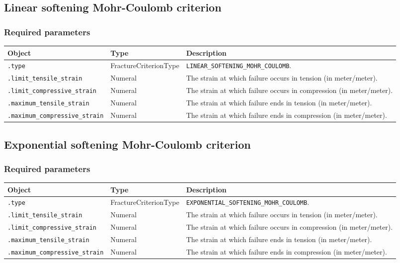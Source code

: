 \documentclass[10pt]{article}
\begin{document}
\subsection{Linear softening Mohr-Coulomb criterion}

\subsubsection*{Required parameters}

\begin{tabularx}{\textwidth}{llX}
\hline 
Object & Type & Description \\ 
\hline 
\verb+.type+ & FractureCriterionType & \verb+LINEAR_SOFTENING_MOHR_COULOMB+. \\ 
\verb+.limit_tensile_strain+ & Numeral & The strain at which failure occurs in tension (in meter/meter).\\
\verb+.limit_compressive_strain+ & Numeral & The strain at which failure occurs in compression (in meter/meter).\\
\verb+.maximum_tensile_strain+ & Numeral & The strain at which failure ends in tension (in meter/meter).\\
\verb+.maximum_compressive_strain+ & Numeral & The strain at which failure ends in compression (in meter/meter).\\
\hline 
\end{tabularx}

\subsection{Exponential softening Mohr-Coulomb criterion}

\subsubsection*{Required parameters}

\begin{tabularx}{\textwidth}{llX}
\hline 
Object & Type & Description \\ 
\hline 
\verb+.type+ & FractureCriterionType & \verb+EXPONENTIAL_SOFTENING_MOHR_COULOMB+. \\ 
\verb+.limit_tensile_strain+ & Numeral & The strain at which failure occurs in tension (in meter/meter).\\
\verb+.limit_compressive_strain+ & Numeral & The strain at which failure occurs in compression (in meter/meter).\\
\verb+.maximum_tensile_strain+ & Numeral & The strain at which failure ends in tension (in meter/meter).\\
\verb+.maximum_compressive_strain+ & Numeral & The strain at which failure ends in compression (in meter/meter).\\
\hline 
\end{tabularx}
\end{document}
